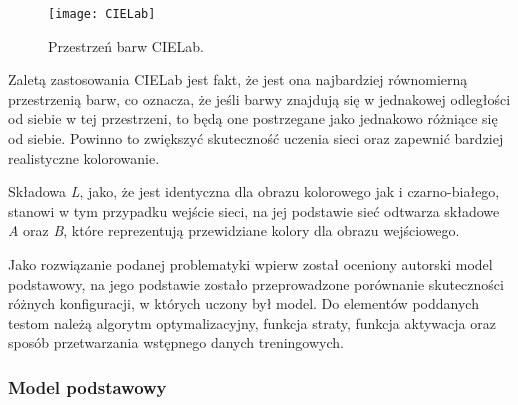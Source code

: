   \begin{figure}[ht]
    \centering
    \texttt{[image: CIELab]}
    \caption[Przestrzeń barw CIELab - źródło:
    \url{https://www.flickr.com/photos/greenmambagreenmamba/4236391637}]
    {Przestrzeń barw CIELab.}
    \label{fig:CIELab}
  \end{figure}

  Zaletą zastosowania CIELab jest fakt, że jest ona najbardziej równomierną
  przestrzenią barw, co oznacza, że jeśli barwy znajdują się w jednakowej
  odległości od siebie w tej przestrzeni, to będą one postrzegane jako jednakowo
  różniące się od siebie. Powinno to zwiększyć skuteczność uczenia sieci oraz
  zapewnić bardziej realistyczne kolorowanie.

  Składowa \textit{L}, jako, że jest identyczna dla obrazu kolorowego jak i
  czarno-białego, stanowi w tym przypadku wejście sieci, na jej podstawie sieć
  odtwarza składowe \textit{A} oraz \textit{B}, które reprezentują przewidziane
  kolory dla obrazu wejściowego.

  Jako rozwiązanie podanej problematyki wpierw został oceniony autorski
  model podstawowy, na jego podstawie zostało przeprowadzone porównanie skuteczności
  różnych konfiguracji, w których uczony był model. Do elementów poddanych
  testom należą algorytm optymalizacyjny, funkcja straty, funkcja aktywacja oraz
  sposób przetwarzania wstępnego danych treningowych.

  \subsubsection{Model podstawowy}


